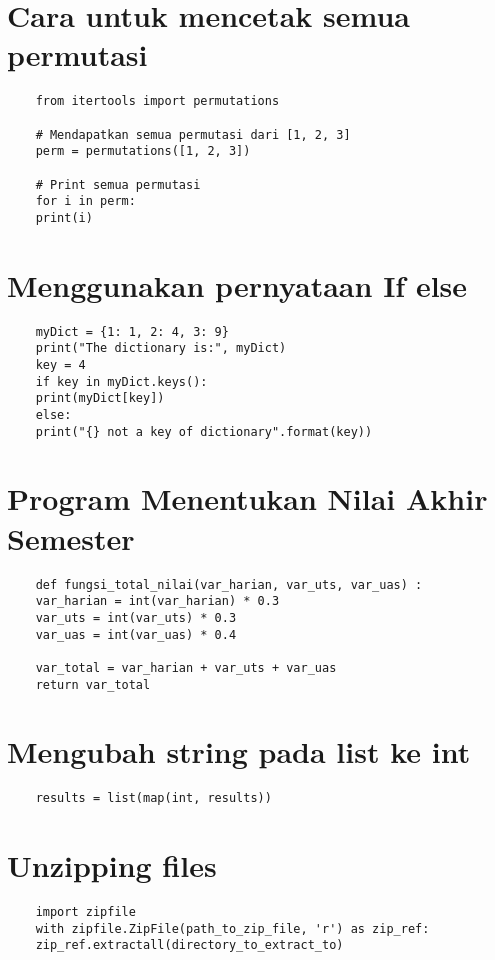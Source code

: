 \documentclass{article}
\begin{document}
\section {Cara untuk mencetak semua permutasi}
\begin{lstlisting}
	from itertools import permutations
	
	# Mendapatkan semua permutasi dari [1, 2, 3]
	perm = permutations([1, 2, 3])
	
	# Print semua permutasi
	for i in perm:
	print(i)
\end{lstlisting}

\section {Menggunakan pernyataan If else}
\begin{lstlisting}
	myDict = {1: 1, 2: 4, 3: 9}
	print("The dictionary is:", myDict)
	key = 4
	if key in myDict.keys():
	print(myDict[key])
	else:
	print("{} not a key of dictionary".format(key))
\end{lstlisting}

\section {Program Menentukan Nilai Akhir Semester}
\begin{lstlisting}
	def fungsi_total_nilai(var_harian, var_uts, var_uas) :
	var_harian = int(var_harian) * 0.3
	var_uts = int(var_uts) * 0.3
	var_uas = int(var_uas) * 0.4
	
	var_total = var_harian + var_uts + var_uas
	return var_total
\end{lstlisting}

\section {Mengubah string pada list ke int}
\begin{lstlisting}
	results = list(map(int, results))
\end{lstlisting}

\section {Unzipping files}
\begin{lstlisting}
	import zipfile
	with zipfile.ZipFile(path_to_zip_file, 'r') as zip_ref:
	zip_ref.extractall(directory_to_extract_to)
\end{lstlisting}
\end{document}
